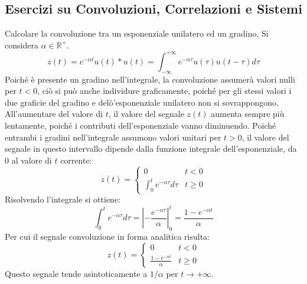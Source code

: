 \documentclass{article}
\numberwithin{equation}{subsection}
\begin{document}
\subsection{Esercizi su Convoluzioni, Correlazioni e Sistemi}

Calcolare la convoluzione tra un esponenziale unilatero ed un gradino, 
Si considera $\alpha\in\mathbb{R}^+$. 
\begin{equation*}
    z(t)=e^{-\alpha t}u(t)*u(t)=\displaystyle\int_{-\infty}^{+\infty}e^{-\alpha\tau}u(\tau)u(t-\tau)d\tau
\end{equation*}
Poiché è presente un gradino nell'integrale, la convoluzione assumerà valori nulli per $t<0$, ciò si può anche individure graficamente, poiché per gli stessi valori i due 
graficie del gradino e delò'esponenziale unilatero non si sovrappongono. All'aumentare del valore di $t$, il valore del segnale $z(t)$ aumenta sempre più lentamente, poiché i 
contributi dell'esponenziale vanno diminuendo. Poiché entrambi i gradini nell'integrale assumono valori unitari per $t>0$, il valore del segnale in questo intervallo 
dipende dalla funzione integrale dell'esponenziale, da $0$ al valore di $t$ corrente:
\begin{equation*}
    z(t)=\begin{cases}
        0&t<0\\
        \displaystyle\int_0^te^{-\alpha \tau}d\tau&t\geq0
    \end{cases}
\end{equation*}
Risolvendo l'integrale si ottiene:
\begin{equation*}
    \displaystyle\int_0^te^{-\alpha \tau}d\tau=\left|-\frac{e^{-\alpha\tau}}{\alpha}\right|^t_0=\frac{1-e^{-\alpha t}}{\alpha}
\end{equation*}
Per cui il segnale convoluzione in forma analitica risulta:
\begin{equation*}
    z(t)=\begin{cases}
        0&t<0\\
        \displaystyle\frac{1-e^{-\alpha t}}{\alpha}&t\geq0
    \end{cases}
\end{equation*}
Questo segnale tende asintoticamente a $1/\alpha$ per $t\to+\infty$. 
\end{document}
